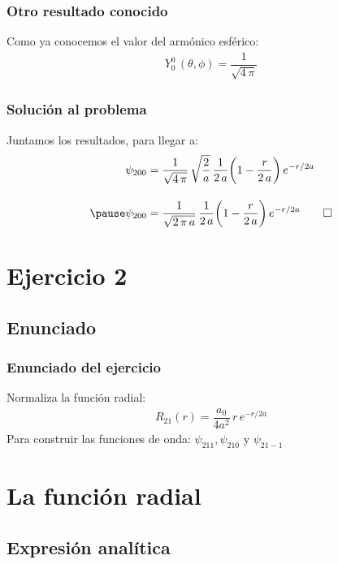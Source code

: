 \documentclass[12pt]{beamer}
\begin{document}
\begin{frame}
\frametitle{Otro resultado conocido}
Como ya conocemos el valor del armónico esférico:
\begin{align*}
Y_{0}^{0} \, (\theta, \phi) = \dfrac{1}{\sqrt{4 \, \pi}}
\end{align*}
\end{frame}
\begin{frame}
\frametitle{Solución al problema}
Juntamos los resultados, para llegar a:
\pause
\begin{eqnarray*}
\begin{aligned}
\psi_{200} &= \dfrac{1}{\sqrt{4 \, \pi}} \, \sqrt{\dfrac{2}{a}} \, \dfrac{1}{2 \, a} \bigg( 1 - \dfrac{r}{2 \, a} \bigg) \, e^{-r/2a} \\[1em] \pause
\psi_{200} &= \dfrac{1}{\sqrt{2 \, \pi \, a}} \, \dfrac{1}{2 \, a} \bigg( 1 - \dfrac{r}{2 \, a} \bigg) \, e^{-r/2a} \qed
\end{aligned}
\end{eqnarray*}
\end{frame}

\section{Ejercicio 2}
\subsection{Enunciado}

\begin{frame}
\frametitle{Enunciado del ejercicio}
Normaliza la función radial:
\begin{align*}
R_{21} (r) = \dfrac{a_{0}}{4 a^{2}} \, r \, e^{-r/2a}
\end{align*}
\pause
Para construir las funciones de onda: $\psi_{211}, \psi_{210}$ y $\psi_{21-1}$
\end{frame}



\section{La función radial}
\subsection{Expresión analítica}
\end{document}
